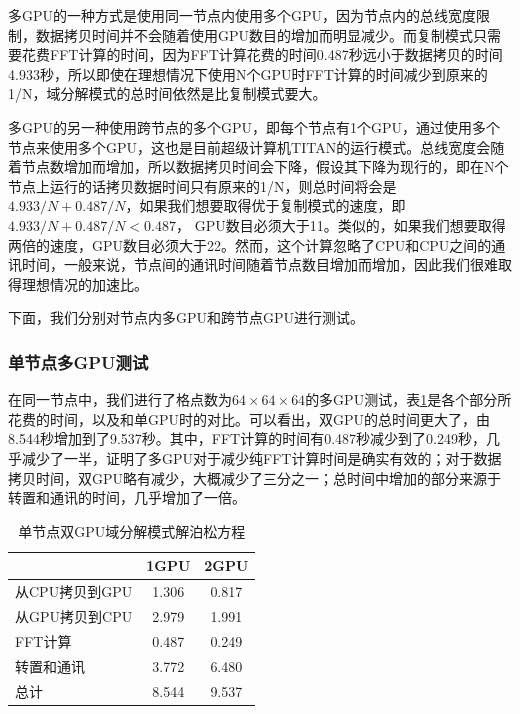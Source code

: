 多GPU的一种方式是使用同一节点内使用多个GPU，因为节点内的总线宽度限制，数据拷贝时间并不会随着使用GPU数目的增加而明显减少。而复制模式只需要花费FFT计算的时间，因为FFT计算花费的时间0.487秒远小于数据拷贝的时间4.933秒，所以即使在理想情况下使用N个GPU时FFT计算的时间减少到原来的1/N，域分解模式的总时间依然是比复制模式要大。

多GPU的另一种使用跨节点的多个GPU，即每个节点有1个GPU，通过使用多个节点来使用多个GPU，这也是目前超级计算机TITAN的运行模式。总线宽度会随着节点数增加而增加，所以数据拷贝时间会下降，假设其下降为现行的，即在N个节点上运行的话拷贝数据时间只有原来的1/N，则总时间将会是 $4.933/N+0.487/N$，如果我们想要取得优于复制模式的速度，即 $4.933/N+0.487/N<0.487$， GPU数目必须大于11。类似的，如果我们想要取得两倍的速度，GPU数目必须大于22。然而，这个计算忽略了CPU和CPU之间的通讯时间，一般来说，节点间的通讯时间随着节点数目增加而增加，因此我们很难取得理想情况的加速比。

下面，我们分别对节点内多GPU和跨节点GPU进行测试。

\subsubsection{单节点多GPU测试}
在同一节点中，我们进行了格点数为$64 \times 64 \times 64$的多GPU测试，表\ref{tab:2GPU_Poisson}是各个部分所花费的时间，以及和单GPU时的对比。可以看出，双GPU的总时间更大了，由8.544秒增加到了9.537秒。其中，FFT计算的时间有0.487秒减少到了0.249秒，几乎减少了一半，证明了多GPU对于减少纯FFT计算时间是确实有效的；对于数据拷贝时间，双GPU略有减少，大概减少了三分之一；总时间中增加的部分来源于转置和通讯的时间，几乎增加了一倍。
\begin{table}[!htbp]
    \centering
    \footnotesize%
    \setlength{\tabcolsep}{4pt}%
    \renewcommand{\arraystretch}{1.2}%
    \begin{tabular}{lcc}
        \hline\hline
                          & 1GPU    & 2GPU   \\
        \hline\hline
        从CPU拷贝到GPU    & 1.306   & 0.817  \\
        \hline
        从GPU拷贝到CPU    & 2.979   & 1.991  \\
        \hline
        FFT计算           & 0.487   & 0.249  \\
        \hline
        转置和通讯        & 3.772   & 6.480  \\
        \hline
        总计              & 8.544   & 9.537  \\
        \hline\hline
    \end{tabular}
    \caption{单节点双GPU域分解模式解泊松方程}
    \label{tab:2GPU_Poisson}
\end{table}

